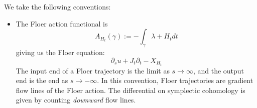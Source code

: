 
\begin{convention}
We take the following conventions:
\begin{itemize}
    \item The Floer action functional is 
    \[A_{H_t}(\gamma):=-\int_\gamma \lambda+ H_t dt\]
    giving us the Floer equation:
    \[\partial_su +J_t \partial_t -X_{H_t}\]
    The input end of a Floer trajectory is the limit as $s\to\infty$, and the output end is the end as $s\to-\infty$. In this convention, Floer trajectories are gradient flow lines of the Floer action. The differential on symplectic cohomology is given by counting \emph{downward} flow lines.
\end{itemize}


\end{convention}